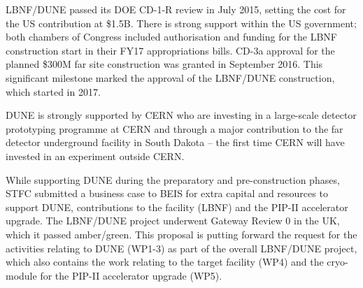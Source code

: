 LBNF/DUNE passed its DOE CD-1-R review in July 2015, setting the cost for the US contribution at \$1.5B. There is strong support within the US government; both chambers of Congress included authorisation and funding for the LBNF construction start in their FY17 appropriations bills. CD-3a approval for the planned \$300M far site construction was granted in September 2016. This significant milestone marked the approval of the LBNF/DUNE construction, which started in 2017. 

DUNE is strongly supported by CERN who are investing in a large-scale detector prototyping programme at CERN and through a major contribution to the far detector underground facility in South Dakota -- the first time CERN will have invested in an experiment outside CERN. 

While supporting DUNE during the preparatory and pre-construction phases, STFC submitted a business case to BEIS for extra capital and resources to support DUNE, contributions to the facility (LBNF) and the PIP-II accelerator upgrade. The LBNF/DUNE project underwent Gateway Review 0 in the UK, which it passed amber/green. This proposal is putting forward the request for the activities relating to DUNE (WP1-3) as part of the overall LBNF/DUNE project, which also contains the work relating to the target facility (WP4) and the cryo-module for the PIP-II accelerator upgrade (WP5). 